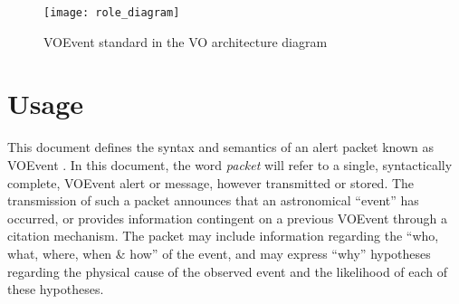 \documentclass[11pt,a4paper]{ivoa}
\begin{document}
\begin{figure}[ht!]
\centering\texttt{[image: role\_diagram]}
\caption{VOEvent standard in the VO architecture diagram}
\label{fig:diagram}
\end{figure}


\section{Usage}
\label{sec:2}
This document defines the syntax and semantics of an alert packet known as
VOEvent \citep{2011ivoa.spec.0711S}. In this document, the word \emph{packet}
will refer to a single, syntactically complete, VOEvent alert or message,
however transmitted or stored. The transmission of such a packet announces that
an astronomical ``event'' has occurred, or provides information contingent on a
previous VOEvent through a citation mechanism. The packet may include
information regarding the ``who, what, where, when \& how'' of the event, and
may express ``why'' hypotheses regarding the physical cause of the observed
event and the likelihood of each of these hypotheses.
\end{document}
